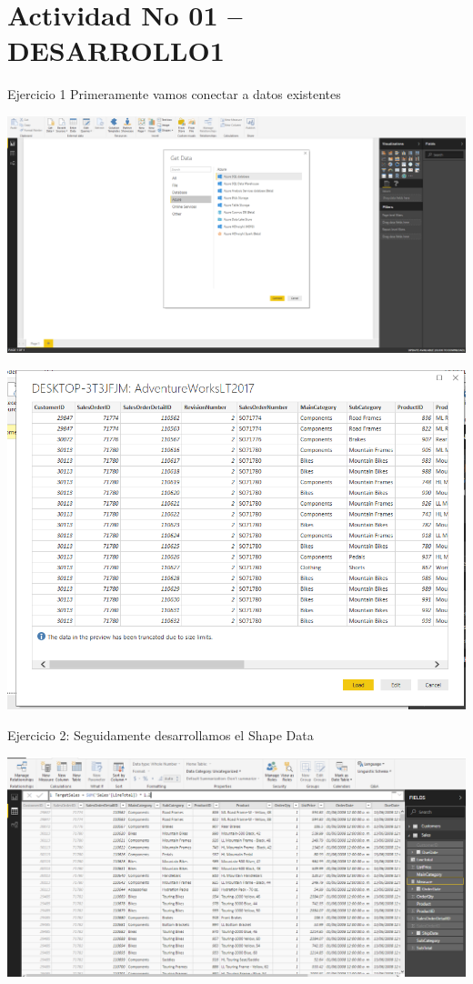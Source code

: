  \section{Actividad No 01 – DESARROLLO1} 
Ejercicio 1  Primeramente vamos conectar a datos existentes \\
	\begin{center}
	\includegraphics[width=15cm]{./Imagenes/Imagen1}
	\end{center}	

	\begin{center}
	\includegraphics[width=15cm]{./Imagenes/Imagen2}
	\end{center}
	\newpage
	
Ejercicio 2: Seguidamente desarrollamos el Shape Data\\
	\begin{center}
	\includegraphics[width=15cm]{./Imagenes/Imagen3}
	\end{center}	

